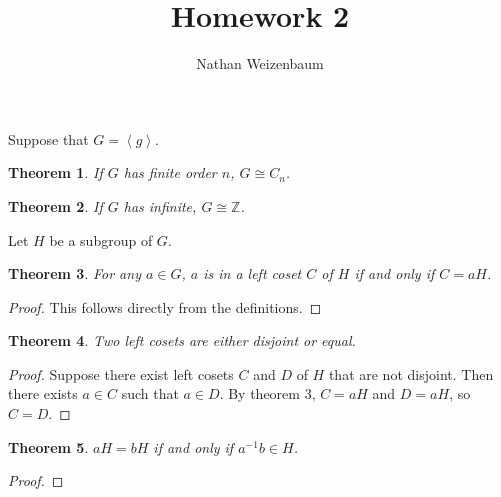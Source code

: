 \documentclass{amsart}
\title{Homework 2}
\author{Nathan Weizenbaum}
\newtheorem{thm}{Theorem}
\begin{document}
\maketitle

Suppose that $G = \left< g \right>$.

\begin{thm}
  If $G$ has finite order $n$, $G \cong C_n$.
\end{thm}

\begin{thm}
  If $G$ has infinite, $G \cong \mathbb{Z}$.
\end{thm}


Let $H$ be a subgroup of $G$.

\begin{thm}
  For any $a \in G$, $a$ is in a left coset $C$ of $H$
  if and only if $C = aH$.
\end{thm}

\begin{proof}
  This follows directly from the definitions.
\end{proof}

\begin{thm}
  Two left cosets are either disjoint or equal.
\end{thm}

\begin{proof}
  Suppose there exist left cosets $C$ and $D$ of $H$ that are not disjoint.
  Then there exists $a \in C$ such that $a \in D$.
  By theorem 3, $C = aH$ and $D = aH$, so $C = D$.
\end{proof}

\begin{thm}
  $aH = bH$ if and only if $a^{-1}b \in H$.
\end{thm}

\begin{proof}
  
\end{proof}
\end{document}
